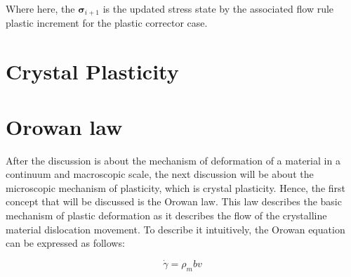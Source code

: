 \documentclass[12pt]{article}
\begin{document}
Where here, the $\boldsymbol{\sigma}_{i+1}$ is the updated stress state by the associated flow rule plastic increment for the plastic 
corrector case.

\section*{Crystal Plasticity}
\section{Orowan law}
\hspace{2em}After the discussion is about the mechanism of deformation of a material in a continuum and macroscopic scale,
the next discussion will be about the microscopic mechanism of plasticity, which is crystal plasticity. Hence, the first 
concept that will be discussed is the Orowan law. This law describes the basic mechanism of plastic deformation
as it describes the flow of the crystalline material dislocation movement. To describe it intuitively, 
the Orowan equation can be expressed as follows:

\begin{equation}
    \dot{\gamma} = \rho_m b v
\end{equation}
\end{document}
